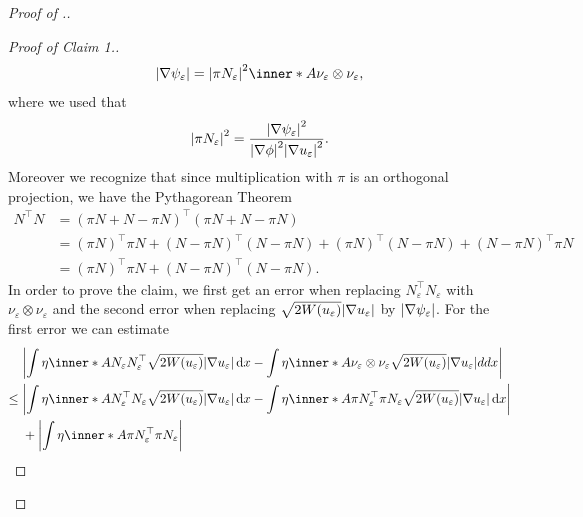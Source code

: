 \begin{proof}[Proof of .]
\begin{proof}[Proof of Claim 1.]
\begin{align*}
{{			\abs{ \nabla \psi_{ \varepsilon } } } }
			= 
			\abs{ \pi N_{ \varepsilon } }^{ 2 }
			\inner*{ A }{ \nu_{ \varepsilon } \otimes \nu_{ \varepsilon } },
		\end{align*}
		where we used that 
		\begin{equation*}
			\abs{ \pi N_{ \varepsilon } }^{ 2 }
			=
			\frac{ \abs{ \nabla \psi_{ \varepsilon } }^{ 2 } }{ \abs{ \nabla 
			\phi }^{ 2 } \abs{ \nabla u_{ \varepsilon } }^{ 2 } }.
		\end{equation*}
		Moreover we recognize that since multiplication with $ \pi $ is 
		an orthogonal projection, we have the Pythagorean Theorem
		\begin{align*}
			N^{ \top } N 
			& =
			( \pi N + N - \pi N )^{ \top } ( \pi N + N - \pi N )
			\\
			& =
			( \pi N )^{ \top } \pi N 
			+
			( N - \pi N )^{ \top } ( N - \pi N )
			+
			( \pi N )^{ \top } ( N - \pi N )
			+
			( N - \pi N )^{ \top } \pi N 
			\\
			& =
			( \pi N )^{ \top } \pi N
			+
			( N - \pi N )^{ \top } ( N - \pi N ).
		\end{align*}
		In order to prove the claim, we first get an error when replacing $ N_{ 
		\varepsilon }^{ \top } N_{ \varepsilon } $ with $ \nu_{ \varepsilon } 
		\otimes \nu_{ \varepsilon } $ and the second error when replacing $ 
		\sqrt{ 2 W ( u_{ \varepsilon } ) } \abs{ \nabla u_{ \varepsilon } } $ 
		by $ \abs{ \nabla \psi_{ \varepsilon } } $.
		For the first error we can estimate
		\begin{align*}
			& \abs{ 
				\int
					\eta 
					\inner*{ A }{ N_{ \varepsilon } N_{ \varepsilon }^{ \top } }
					\sqrt{ 2 W ( u_{ \varepsilon } ) } \abs{ \nabla u_{ 
					\varepsilon } }
				\dd{ x }
				-
				\int
					\eta
					\inner*{ A }{ \nu_{ \varepsilon } \otimes \nu_{ \varepsilon 
					} }
					\sqrt{ 2 W ( u_{ \varepsilon } ) } \abs{ \nabla u_{ 
					\varepsilon } }
				dd{ x }
			}
			\\
			\leq{} &
			\abs{ 
				\int
					\eta 
					\inner*{ A }{ N_{ \varepsilon }^{ \top } N_{ \varepsilon } }
					\sqrt{ 2 W ( u_{ \varepsilon } ) } \abs{ \nabla u_{ 
					\varepsilon } } 
				\dd{ x }
				-
				\int 
					\eta
					\inner*{ A }
					{ \pi N_{ \varepsilon }^{ \top } \pi N_{ \varepsilon } }
					\sqrt{ 2 W ( u_{ \varepsilon } ) }
					\abs{ \nabla u_{ \varepsilon } }
				\dd{ x }
			}
			\\
			& + 
			\abs{ 
				\int
					\eta
					\inner*{ A }
					{ \pi N_{ \varepsilon }^{ \top } \pi N_{ \varepsilon } }
}
\end{align*}
\end{proof}
\end{proof}
